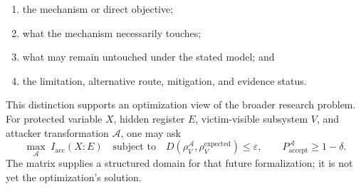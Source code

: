 \begin{enumerate}[leftmargin=1.8em]
  \item the mechanism or direct objective;
  \item what the mechanism necessarily touches;
  \item what may remain untouched under the stated model; and
  \item the limitation, alternative route, mitigation, and evidence status.
\end{enumerate}

This distinction supports an optimization view of the broader research problem.
For protected variable $X$, hidden register $E$, victim-visible subsystem $V$,
and attacker transformation $\mathcal{A}$, one may ask
\begin{equation}
  \max_{\mathcal{A}}\; I_{\mathrm{acc}}(X:E)
  \quad\text{subject to}\quad
  D\!\left(\rho_V^{\mathcal{A}},\rho_V^{\mathrm{expected}}\right)\leq\varepsilon,
  \qquad
  P_{\mathrm{accept}}^{\mathcal{A}}\geq 1-\delta.
  \label{eq:matrix-security-optimization}
\end{equation}
The matrix supplies a structured domain for that future formalization; it is not
yet the optimization's solution.

